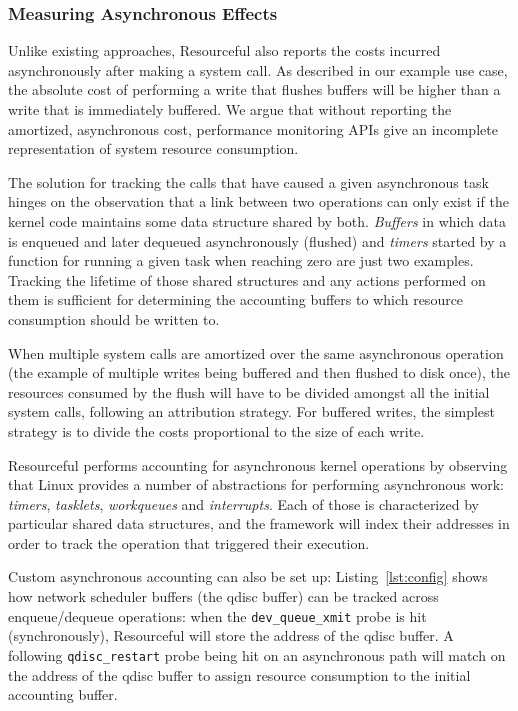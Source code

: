 \documentclass[letterpaper,twocolumn,10pt]{article}
\newcommand{\pname}{Resourceful}
\begin{document}
\subsubsection{Measuring Asynchronous Effects}
Unlike existing approaches, \pname{} also reports the costs incurred
asynchronously after making a system call. As described in our example
use case, the absolute cost of performing a write that flushes buffers will be
higher than a write that is immediately buffered. We argue that without
reporting the amortized, asynchronous cost, performance monitoring APIs give an
incomplete representation of system resource consumption.

The solution for tracking the calls that have caused a given asynchronous task
hinges on the observation that a link between two operations can only exist if
the kernel code maintains some data structure shared by both. \textit{Buffers}
in which data is enqueued and later dequeued asynchronously (flushed) and
\textit{timers} started by a function for running a given task when reaching
zero are just two examples. Tracking the lifetime of those shared structures and
any actions performed on them is sufficient for determining the accounting
buffers to which resource consumption should be written to. 

When multiple system calls are amortized over the same asynchronous operation
(the example of multiple writes being buffered and then flushed to disk once),
the resources consumed by the flush will have to be divided amongst all the
initial system calls, following an attribution strategy. For buffered writes,
the simplest strategy is to divide the costs proportional to the size of each
write.

\pname{ }performs accounting for asynchronous kernel operations by observing that
Linux provides a number of abstractions for performing asynchronous work:
\emph{timers}, \emph{tasklets}, \emph{workqueues} and \emph{interrupts}. Each of
those is characterized by particular shared data structures, and the framework
will index their addresses in order to track the operation that triggered their
execution. 

Custom asynchronous accounting can also be set up:
Listing~\ref{lst:config} shows how network scheduler buffers (the qdisc buffer)
can be tracked across enqueue/dequeue operations: when the
\texttt{dev\_queue\_xmit} probe is hit (synchronously), \pname{ }will store the
address of the qdisc buffer. A following \texttt{qdisc\_restart} probe being hit
on an asynchronous path will match on the address of the qdisc buffer to assign
resource consumption to the initial accounting buffer.
\end{document}
